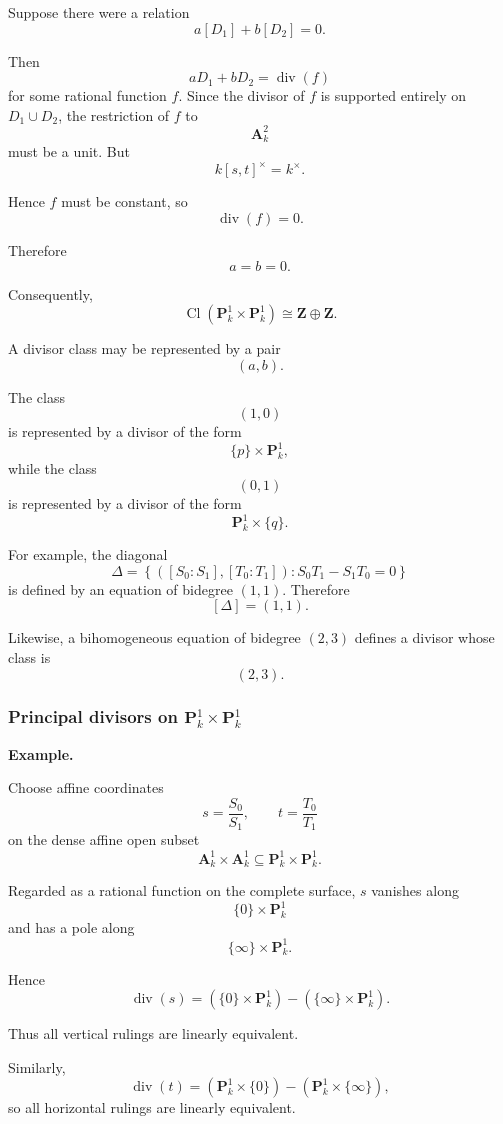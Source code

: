 \documentclass[12pt,a4paper]{article}
\theoremstyle{notespace}
\begin{document}
Suppose there were a relation
\[
a[D_1]+b[D_2]=0.
\]

Then
\[
aD_1+bD_2=\operatorname{div}(f)
\]
for some rational function \(f\). Since the divisor of \(f\) is supported entirely on \(D_1\cup D_2\), the restriction of \(f\) to
\[
\mathbf A^2_k
\]
must be a unit. But
\[
k[s,t]^\times=k^\times.
\]

Hence \(f\) must be constant, so
\[
\operatorname{div}(f)=0.
\]

Therefore
\[
a=b=0.
\]

Consequently,
\[
\boxed{
	\operatorname{Cl}(\mathbf P^1_k\times\mathbf P^1_k)
	\cong
	\mathbf Z\oplus\mathbf Z.
}
\]

A divisor class may be represented by a pair
\[
(a,b).
\]

The class
\[
(1,0)
\]
is represented by a divisor of the form
\[
\{p\}\times\mathbf P^1_k,
\]
while the class
\[
(0,1)
\]
is represented by a divisor of the form
\[
\mathbf P^1_k\times\{q\}.
\]

For example, the diagonal
\[
\Delta
=
\left\{
([S_0:S_1],[T_0:T_1])
:
S_0T_1-S_1T_0=0
\right\}
\]
is defined by an equation of bidegree \((1,1)\). Therefore
\[
[\Delta]=(1,1).
\]

Likewise, a bihomogeneous equation of bidegree \((2,3)\) defines a divisor whose class is
\[
(2,3).
\]

\subsubsection{Principal divisors on \(\mathbf P^1_k\times\mathbf P^1_k\)}

\textbf{Example.}

Choose affine coordinates
\[
s=\frac{S_0}{S_1},
\qquad
t=\frac{T_0}{T_1}
\]
on the dense affine open subset
\[
\mathbf A^1_k\times\mathbf A^1_k
\subseteq
\mathbf P^1_k\times\mathbf P^1_k.
\]

Regarded as a rational function on the complete surface, \(s\) vanishes along
\[
\{0\}\times\mathbf P^1_k
\]
and has a pole along
\[
\{\infty\}\times\mathbf P^1_k.
\]

Hence
\[
\operatorname{div}(s)
=
(\{0\}\times\mathbf P^1_k)
-
(\{\infty\}\times\mathbf P^1_k).
\]

Thus all vertical rulings are linearly equivalent.

Similarly,
\[
\operatorname{div}(t)
=
(\mathbf P^1_k\times\{0\})
-
(\mathbf P^1_k\times\{\infty\}),
\]
so all horizontal rulings are linearly equivalent.
\end{document}
